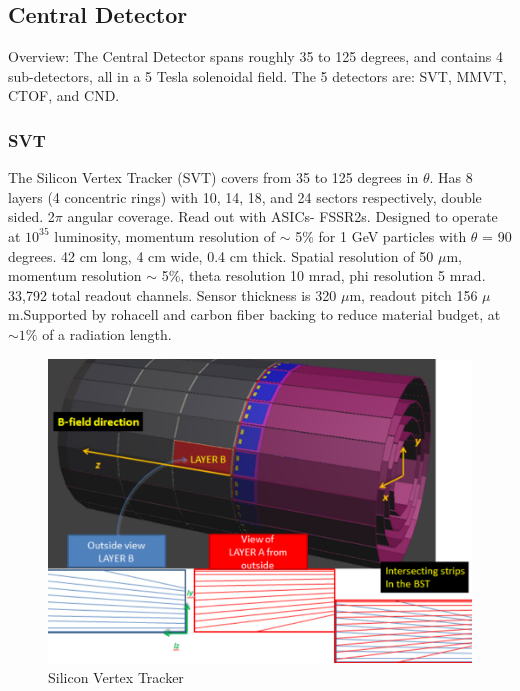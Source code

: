     \subsection{Central Detector}
        Overview: The Central Detector spans roughly 35 to 125 degrees, and contains 4 sub-detectors, all in a 5 Tesla solenoidal field. The 5 detectors are: SVT, MMVT, CTOF, and CND. 
        \subsubsection{SVT}
            The Silicon Vertex Tracker (SVT) covers from 35 to 125 degrees in $\theta$. Has 8 layers (4 concentric rings) with 10, 14, 18, and 24 sectors respectively, double sided. 2$\pi$ angular coverage. Read out with ASICs- FSSR2s. Designed to operate at $10^{35}$ luminosity, momentum resolution of $\sim$ 5\% for 1 GeV particles with $\theta$ = 90 degrees. 42 cm long, 4 cm wide, 0.4 cm thick. Spatial resolution of 50 $\mu$m, momentum resolution $\sim$ 5\%, theta resolution 10 mrad, phi resolution 5 mrad.  33,792 total readout channels. Sensor thickness is 320 $\mu$m, readout pitch 156 $\mu$ m.Supported by rohacell and carbon fiber backing to reduce material budget, at $\sim 1\%$ of a radiation length.
            
            \begin{figure}[H]
    			\centering
    			\includegraphics[width=12cm]{Chapters/Ch2-Experiment/clas-12-system/pics/cd/svt.PNG}
    			\caption{Silicon Vertex Tracker}
			\end{figure}  
			
